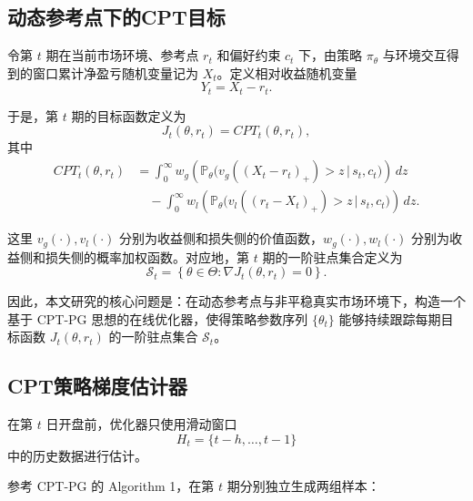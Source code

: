 \subsection{动态参考点下的CPT目标}

令第 $t$ 期在当前市场环境、参考点 $r_t$ 和偏好约束 $c_t$ 下，由策略 $\pi_\theta$ 与环境交互得到的窗口累计净盈亏随机变量记为 $X_t$。定义相对收益随机变量
\begin{equation}
Y_t = X_t-r_t.
\end{equation}

于是，第 $t$ 期的目标函数定义为
\begin{equation}
J_t(\theta,r_t)=CPT_t(\theta,r_t),
\end{equation}
其中
\begin{equation}
\label{eq:CPT-objective}
\begin{aligned}
CPT_t(\theta,r_t)
&=
\int_0^\infty
w_g\!\left(
\mathbb P_\theta\!\bigl(v_g((X_t-r_t)_+) > z \,\big|\, s_t,c_t\bigr)
\right)\,dz \\
&\quad -
\int_0^\infty
w_l\!\left(
\mathbb P_\theta\!\bigl(v_l((r_t-X_t)_+) > z \,\big|\, s_t,c_t\bigr)
\right)\,dz .
\end{aligned}
\end{equation}

这里 $v_g(\cdot),v_l(\cdot)$ 分别为收益侧和损失侧的价值函数，$w_g(\cdot),w_l(\cdot)$ 分别为收益侧和损失侧的概率加权函数。对应地，第 $t$ 期的一阶驻点集合定义为
\begin{equation}
\mathcal S_t
=
\left\{
\theta\in\Theta:\nabla J_t(\theta,r_t)=0
\right\}.
\end{equation}

因此，本文研究的核心问题是：在动态参考点与非平稳真实市场环境下，构造一个基于 CPT-PG 思想的在线优化器，使得策略参数序列 $\{\theta_t\}$ 能够持续跟踪每期目标函数 $J_t(\theta,r_t)$ 的一阶驻点集合 $\mathcal S_t$。

\subsection{CPT策略梯度估计器}

在第 $t$ 日开盘前，优化器只使用滑动窗口
\begin{equation}
H_t=\{t-h,\dots,t-1\}
\end{equation}
中的历史数据进行估计。

参考 CPT-PG 的 Algorithm 1，在第 $t$ 期分别独立生成两组样本：

